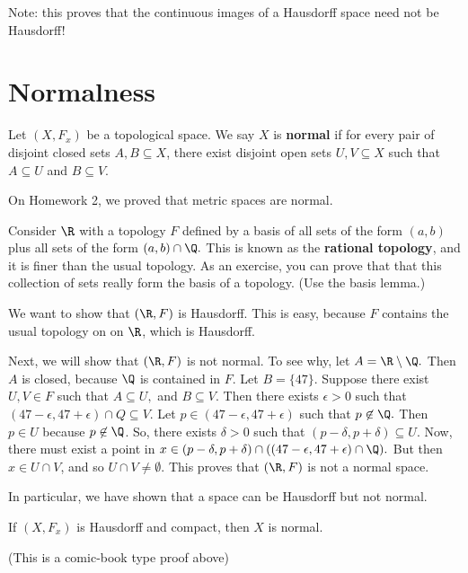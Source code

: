 Note: this proves that the continuous images of a Hausdorff space need not be Hausdorff!

     
\section{Normalness}


\begin{definition}  Let $(X,F_x)$ be a topological space.  We say $X$ is \textbf{normal} if for every pair of disjoint closed sets $A,B \subseteq X$, there exist disjoint open sets $U,V\subseteq X$ such that $A \subseteq U$ and $B \subseteq V$.
\end{definition}


On Homework 2, we proved that metric spaces are normal.

\begin{example}
 Consider $\R$ with a topology $F$ defined by a basis of all sets of the form $(a,b)$ plus all sets of the form $(a,b)\cap \Q.$  This is known as the \textbf{rational topology}, and it is finer than the usual topology.  As an exercise, you can prove that that this collection of sets really form the basis of a topology.  (Use the basis lemma.)
 \end{example}


We want to show that $(\R,F)$ is Hausdorff.  This is easy, because $F$ contains the usual topology on on $\R$, which is Hausdorff.  

Next, we will show that $(\R,F)$ is not normal.  To see why, let $A=\R\setminus\Q.$  Then $A$ is closed, because $\Q$ is contained in $F$.  Let $B=\{47\}.$  Suppose there exist $U,V \in F$ such that $A \subseteq U,$ and $B \subseteq V$.  Then there exists $\epsilon>0$ such that $(47-\epsilon,47+\epsilon)\cap Q \subseteq V$.  Let $p \in (47-\epsilon,47+\epsilon)$ such that $p \not\in \Q.$  Then $p \in U$ because $p \not\in \Q$.  So, there exists $\delta>0$ such that $(p-\delta,p+\delta) \subseteq U$.  Now, there must exist a point in $x \in (p-\delta,p+\delta)\cap((47-\epsilon,47+\epsilon)\cap \Q).$  But then $x \in U \cap V$, and so $U \cap V \neq \emptyset$.  This proves that $(\R,F)$ is not a normal space.

In particular, we have shown that a space can be Hausdorff but not normal.  

\begin{lemma}
If $(X,F_x)$ is Hausdorff and compact, then $X$ is normal.
\end{lemma}
\placeholder
(This is a comic-book type proof above)

